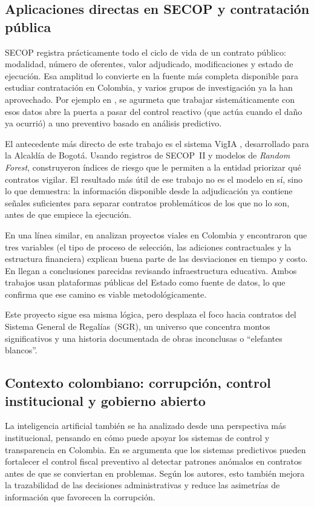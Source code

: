 \subsection{Aplicaciones directas en SECOP y contratación pública}

SECOP registra prácticamente todo el ciclo de vida de un contrato público:
modalidad, número de oferentes, valor adjudicado, modificaciones y estado de
ejecución. Esa amplitud lo convierte en la fuente más completa disponible para
estudiar contratación en Colombia, y varios grupos de investigación ya la han
aprovechado. Por ejemplo en \cite{calderon2025contratacion}, \cite{sierra2025contratacion} se agurmeta que trabajar sistemáticamente con esos datos abre la puerta a pasar
del control reactivo (que actúa cuando el daño ya ocurrió) a uno preventivo
basado en análisis predictivo.

El antecedente más directo de este trabajo es el sistema VigIA
\cite{salazar2024vigia}, desarrollado para la Alcaldía de Bogotá. Usando
registros de SECOP~II y modelos de \textit{Random Forest}, construyeron índices
de riesgo que le permiten a la entidad priorizar qué contratos vigilar. El
resultado más útil de ese trabajo no es el modelo en sí, sino lo que demuestra:
la información disponible desde la adjudicación ya contiene señales suficientes
para separar contratos problemáticos de los que no lo son, antes de que empiece
la ejecución.

En una línea similar, en \cite{gomez2025data} analizan proyectos viales en
Colombia y encontraron que tres variables (el tipo de proceso de selección, las
adiciones contractuales y la estructura financiera) explican buena parte de las
desviaciones en tiempo y costo. En \cite{gomez2025analyzing} llegan a conclusiones
parecidas revisando infraestructura educativa. Ambos trabajos usan plataformas
públicas del Estado como fuente de datos, lo que confirma que ese camino es
viable metodológicamente.

Este proyecto sigue esa misma lógica, pero desplaza el foco hacia contratos del
Sistema General de Regalías~(SGR), un universo que concentra montos significativos
y una historia documentada de obras inconclusas o ``elefantes blancos''.


\subsection{Contexto colombiano: corrupción, control institucional y gobierno abierto}

La inteligencia artificial también se ha analizado desde una perspectiva más institucional, pensando en cómo puede apoyar los sistemas de control y transparencia en Colombia. En \cite{calderon2025contratacion} se argumenta que los sistemas predictivos pueden fortalecer el control fiscal preventivo al detectar patrones anómalos en contratos antes de que se conviertan en problemas. Según los autores, esto también mejora la trazabilidad de las decisiones administrativas y reduce las asimetrías de información que favorecen la corrupción.

